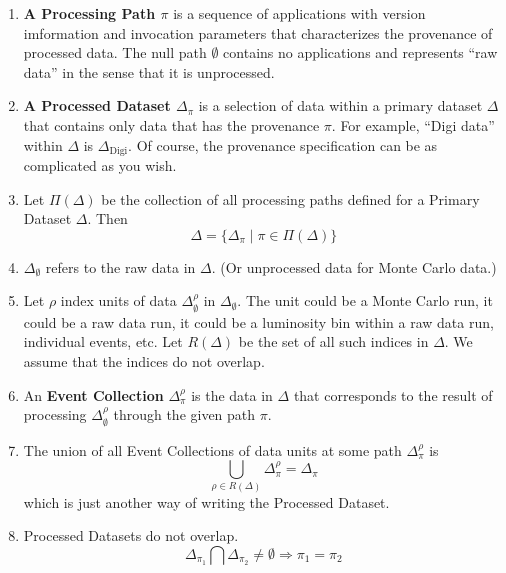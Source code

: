 \documentclass{cmspaper}
\begin{document}
{\begin{enumerate}
\item {\bf A Processing Path $\pi$} is a sequence of applications
      with version imformation and invocation parameters that characterizes
      the provenance of processed data.  The null path $\emptyset$ contains
      no applications and represents ``raw data'' in the sense that it is
      unprocessed.

\item {\bf A Processed Dataset $\Delta_{\pi}$} is a selection of data within 
      a primary dataset $\Delta$ that contains only data that has the 
      provenance $\pi$.  For example, ``Digi data'' within $\Delta$ is 
      $\Delta_{\mbox{Digi}}$.  Of course, the provenance specification can 
      be as complicated as you wish.

\item Let $\Pi(\Delta)$ be the collection of all processing paths defined for a Primary 
Dataset $\Delta $.  Then 
\begin{equation}
    \Delta = \{ \Delta_{\pi} \mid \pi \in \Pi(\Delta) \}
\end{equation}

\item $\Delta_{\emptyset}$ refers to the raw data in $\Delta$. (Or unprocessed data for 
Monte Carlo data.) 

\item Let $\rho$ index units of data $\Delta_{\emptyset}^{\rho}$ 
      in $\Delta_{\emptyset}$.  The unit could be a Monte Carlo run,
      it could be a raw data run, it could be a luminosity bin within
      a raw data run, individual events, etc.  Let $R(\Delta)$ be the
      set of all such indices in $\Delta$.  We assume that the indices
      do not overlap.

\item An {\bf Event Collection} $\Delta_{\pi}^{\rho}$ is the data in 
      $\Delta$ that corresponds to the result of processing 
      $\Delta_{\emptyset}^{\rho}$ through the given path $\pi$.  

\item The union of all Event Collections of data units at some path 
      $\Delta_{\pi}^{\rho}$ is 
\begin{equation}
\bigcup_{\rho \in R(\Delta)} \Delta_{\pi}^{\rho} = \Delta_{\pi}
\end{equation}
which is just another way of writing the Processed Dataset.  

\item Processed Datasets do not overlap.  
\begin{equation}
\Delta_{\pi_1} \bigcap \Delta_{\pi_2} \not= \emptyset \Rightarrow \pi_1 = \pi_2
\end{equation}


\end{enumerate}}
\end{document}

